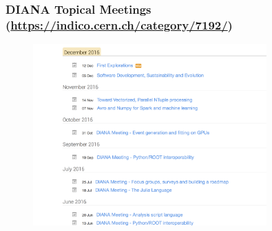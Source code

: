 \begin{frame}
\frametitle{DIANA Topical Meetings (\url{https://indico.cern.ch/category/7192/})}

\begin{figure}[htbp]
\begin{center}
\includegraphics[width=0.8\textwidth]{images/20161213-diana-indico.png}
\end{center}
\end{figure}


\end{frame}


